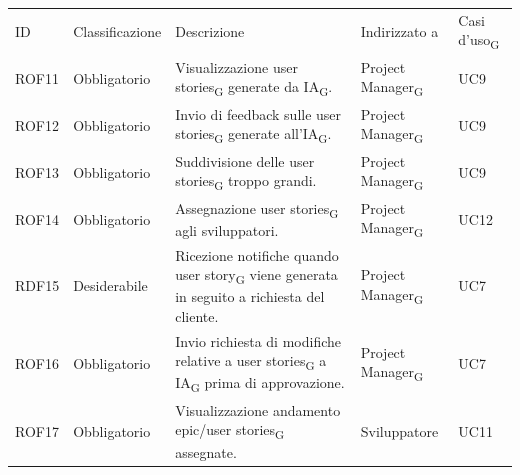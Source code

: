 \documentclass{article}
\begin{document}
\begin{center}
\begin{tabular}{|p{2cm}|p{3cm}|p{6cm}|p{3cm}|p{2cm}|}
\hline
\end{tabular}

    \begin{tabular}{|p{2cm}|p{3cm}|p{6cm}|p{3cm}|p{2cm}|}
    \rowcolor{Blue} 
\hline
ID & Classificazione & Descrizione & Indirizzato a&Casi d'uso\textsubscript{G}  \\ 
\rowcolor{LighterBlue}

ROF11&Obbligatorio & Visualizzazione user stories\textsubscript{G} generate da IA\textsubscript{G}.  & Project Manager\textsubscript{G} & UC9\\
\hline



\rowcolor{LightBlue}
\hline
ROF12&Obbligatorio & Invio di feedback sulle user stories\textsubscript{G} generate all'IA\textsubscript{G}.& Project Manager\textsubscript{G}&UC9\\
\hline
\rowcolor{LighterBlue}

ROF13&Obbligatorio & Suddivisione delle user stories\textsubscript{G} troppo grandi.  & Project Manager\textsubscript{G}& UC9\\
\hline

\rowcolor{LightBlue}

ROF14&Obbligatorio & Assegnazione user stories\textsubscript{G} agli sviluppatori.& Project Manager\textsubscript{G}& UC12\\
\hline

\rowcolor{LighterBlue}

RDF15&Desiderabile & Ricezione notifiche quando user story\textsubscript{G} viene generata in seguito a richiesta del cliente. & Project Manager\textsubscript{G} & UC7\\
\hline

\rowcolor{LightBlue}

ROF16&Obbligatorio & Invio richiesta di modifiche relative a user stories\textsubscript{G} a IA\textsubscript{G} prima di approvazione. & Project Manager\textsubscript{G}& UC7\\
\hline
\rowcolor{LighterBlue}

ROF17&Obbligatorio & Visualizzazione andamento epic/user stories\textsubscript{G} assegnate.& Sviluppatore& UC11\\

\hline


\end{tabular}
\end{center}
\end{document}
